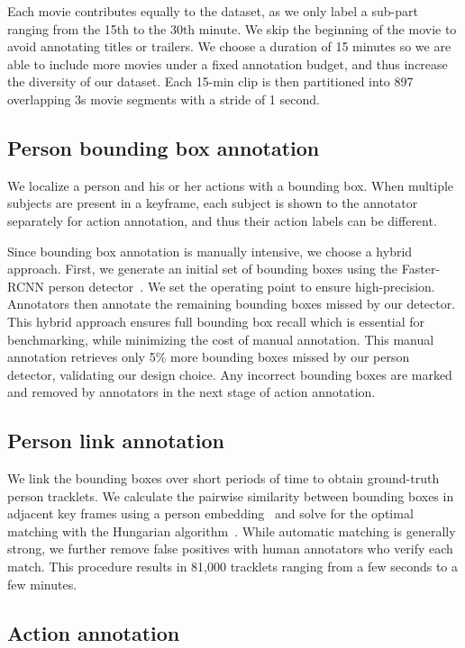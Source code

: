 \documentclass[10pt,twocolumn,letterpaper]{article}
\begin{document}
Each movie contributes equally to the dataset, as we only label a sub-part ranging from the 15th to the 30th minute. We skip the beginning of the movie to avoid annotating titles or trailers. We choose a duration of 15 minutes so we are able to include more movies under a fixed annotation budget, and thus increase the diversity of our dataset. Each 15-min clip is then partitioned into 897 overlapping 3s movie segments with a stride of 1 second.

\subsection{Person bounding box annotation}

We localize a person and his or her actions with a bounding box. When multiple subjects are present in a keyframe, each subject is shown to the annotator separately for action annotation, and thus their action labels can be different.

Since bounding box annotation is manually intensive, we choose a hybrid approach. First, we generate an initial set of bounding boxes using the Faster-RCNN person detector~\cite{ren2015faster}. We set the operating point to ensure high-precision. Annotators then  annotate the remaining bounding boxes missed by our detector. This hybrid approach ensures full bounding box recall which is essential for benchmarking, while minimizing the cost of manual annotation. This manual annotation retrieves only 5\% more bounding boxes missed by our person detector, validating our design choice. Any incorrect bounding boxes are marked and removed by annotators in the next stage of action annotation.

\subsection{Person link annotation}

We link the bounding boxes over short periods of time to obtain ground-truth person tracklets. We calculate the pairwise similarity between bounding boxes in adjacent key frames using a person embedding~\cite{wu2016personnet} and solve for the optimal matching with the Hungarian algorithm~\cite{kuhn1955hungarian}. While automatic matching is generally strong, we further remove false positives with human annotators who verify each match. This procedure results in 81,000 tracklets ranging from a few seconds to a few minutes. 

\subsection{Action annotation}
\label{sec:action_label}
\end{document}
